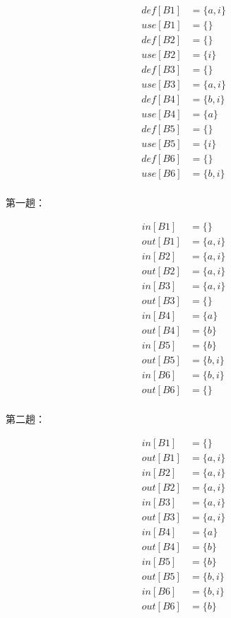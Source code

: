 \documentclass[UTF8]{ctexart}
\begin{document}
\begin{align*}
    def[B1] &= \{a, i\}\\
    use[B1] &= \{\} \\
    def[B2] &= \{\} \\
    use[B2] &= \{i\} \\
    def[B3] &= \{\} \\
    use[B3] &= \{a, i\} \\
    def[B4] &= \{b, i\} \\
    use[B4] &= \{a\} \\
    def[B5] &= \{\} \\
    use[B5] &= \{i\} \\
    def[B6] &= \{\} \\
    use[B6] &= \{b, i\} \\
\end{align*}

第一趟：

\begin{align*}
    in[B1] &= \{\} \\
    out[B1] &= \{a, i\} \\
    in[B2] &= \{a, i\} \\
    out[B2] &= \{a, i\} \\
    in[B3] &= \{a, i\} \\
    out[B3] &= \{\} \\
    in[B4] &= \{a\} \\
    out[B4] &= \{b\} \\
    in[B5] &= \{b\} \\
    out[B5] &= \{b, i\} \\
    in[B6] &= \{b, i\} \\
    out[B6] &= \{\} \\
\end{align*}

第二趟：

\begin{align*}
    in[B1] &= \{\} \\
    out[B1] &= \{a, i\} \\
    in[B2] &= \{a, i\} \\
    out[B2] &= \{a, i\} \\
    in[B3] &= \{a, i\} \\
    out[B3] &= \{a, i\} \\
    in[B4] &= \{a\} \\
    out[B4] &= \{b\} \\
    in[B5] &= \{b\} \\
    out[B5] &= \{b, i\} \\
    in[B6] &= \{b, i\} \\
    out[B6] &= \{b\} \\
\end{align*}
\end{document}
